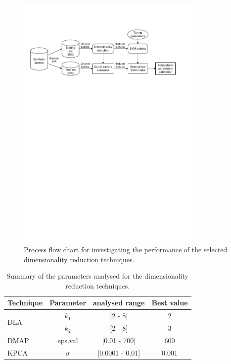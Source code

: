 \documentclass[a4paper,fleqn,usenatbib]{mnras}
\begin{document}
\begin{figure}
\centering\includegraphics[width=0.8\textwidth]{flowchart.pdf}
\caption{Process flow chart for investigating the performance of the 
selected dimensionality reduction techniques.}
\label{fig:flowchart}
\end{figure}

\begin{table}
\centering
\caption{Summary of the parameters analysed for the 
dimensionality reduction techniques.}
\label{tab:parameters}
\begin{tabular}{l c c c}
\hline
\textbf{Technique} & \textbf{Parameter} & \textbf{analysed range} & \textbf{Best value} \\
\hline
\multirow{2}{*}{DLA} 
	& $k_1$ & [2 - 8]  & 2 \\\cline{2-4}
	& $k_2$ & [2 - 8]  & 3 \\\hline
DMAP & eps.val & [0.01 - 700] & 600 \\\hline
KPCA & $\sigma$ & [0.0001 - 0.01] & 0.001 \\
\hline
\end{tabular}
\end{table}
\end{document}
